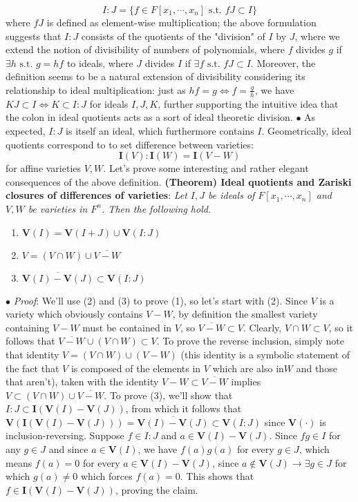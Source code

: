 \documentclass{article}
\newcommand*{\tb}{\textbf}
\newcommand*{\ti}{\textit}
\newcommand*{\n}{\newline}
\newcommand*{\nn}{\newline \newline}
\newcommand*{\Fx}{\ensuremath{F[x_1, \cdots, x_n]}}
\newcommand*{\V}{\ensuremath{\mathbf{V}}}
\newcommand*{\I}{\ensuremath{\mathbf{I}}}
\begin{document}
$$ I : J = \{ f \in \Fx \text{ s.t.  } f J \subset I \} $$
where $ f J $ is defined as element-wise multiplication; the above formulation suggests that $ I : J $ consists of the quotients of the "division" of $ I $ by $ J $, where we extend the notion of divisibility of numbers of polynomials, where $ f $ divides $ g $ if $ \exists h \text{ s.t.  } g = h f $ to ideals, where $ J $ divides $ I $ if $ \exists f \text{ s.t.  } f J \subset I $. Moreover, the definition seems to be a natural extension of divisibility considering its relationship to ideal multiplication: just as $ h f = g \iff f = \frac{g}{h} $, we have $ K J \subset I \iff K \subset I : J $ for ideals $ I, J, K $, further supporting the intuitive idea that the colon in ideal quotients acts as a sort of ideal theoretic division.
\n
\indent $ \bullet $ As expected, $ I : J $ is itself an ideal, which furthermore contains $ I $. Geometrically, ideal quotients correspond to to set difference between varieties:
$$ \I(V) : \I(W) = \I(V - W) $$
for affine varieties $ V, W $.
\nn
Let's prove some interesting and rather elegant consequences of the above definition.
\nn
\tb{(Theorem) Ideal quotients and Zariski closures of differences of varieties}: \ti{Let $ I, J $ be ideals of $ \Fx $ and $ V, W $ be varieties in $ F^n $. Then the following hold.}
\begin{enumerate}
    \item $ \V(I) = \V(I + J) \cup \V(I : J) $
    \item $ V = (V \cap W) \cup \overline{V - W} $
    \item $ \overline{\V(I) - \V(J)} \subset \V(I : J) $
\end{enumerate}
\indent $ \bullet $ \ti{Proof}: We'll use (2) and (3) to prove (1), so let's start with (2).
\n Since $ V $ is a variety which obviously contains $ V - W $, by definition the smallest variety containing $ V - W $ must be contained in $ V $, so $ \overline{V - W} \subset V $. Clearly, $ V \cap W \subset V $, so it follows that $ \overline{V - W} \cup (V \cap W) \subset V $. To prove the reverse inclusion, simply note that identity $ V = (V \cap W) \cup (V - W) $ (this identity is a symbolic statement of the fact that $ V $ is composed of the elements in $ V $ which are also in$ W $ and those that aren't), taken with the identity $ V - W \subset \overline{V - W} $ implies $ V \subset (V \cap W) \cup \overline{V - W} $.
\n
To prove (3), we'll show that $ I : J \subset \I(\V(I) - \V(J)) $, from which it follows that $ \V(\I(\V(I) - \V(J))) = \overline{\V(I) - \V(J)} \subset \V(I : J) $ since $ \V(\cdot) $ is inclusion-reversing. Suppose $ f \in I : J $ and $ a \in \V(I) - \V(J) $. Since $ f g \in I $ for any $ g \in J $ and since $ a \in \V(I) $, we have $ f(a) g(a) $ for every $ g \in J $, which means $ f(a) = 0 $ for every $ a \in \V(I) - \V(J) $, since $ a \notin \V(J) \rightarrow \exists g \in J $ for which $ g(a) \neq 0 $ which forces $ f(a) = 0 $. This shows that $ f \in \I(\V(I) - \V(J)) $, proving the claim.
\end{document}
